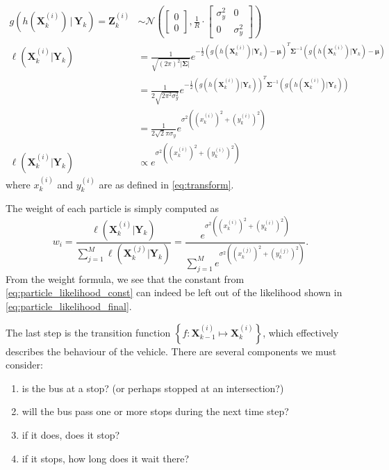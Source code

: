 \documentclass[14paper,twoside]{article}
\newcommand{\bX}{\mathbf{X}}
\newcommand{\bY}{\mathbf{Y}}
\newcommand{\bZ}{\mathbf{Z}}
\newcommand{\g}[1]{g\left(#1\right)}
\newcommand{\lhood}[1]{\ell\left(#1\right)}
\begin{document}
\begin{align}
  \label{eq:particle_likelihood}
  \g{h(\bX_k^{(i)}) \,|\, \bY_k} = \bZ_k^{(i)} 
  &\sim  \mathcal{N}\left(
    \begin{bmatrix}
      0 \\ 0
    \end{bmatrix},
    \frac{1}{R}\cdot\begin{bmatrix}
      \sigma_y^2 & 0 \\ 0 & \sigma_y^2
    \end{bmatrix}
  \right) \\
  \lhood{\bX_k^{(i)}| \bY_k} 
  &= \frac{1}{\sqrt{\left(2\pi\right)^2 \left| \boldsymbol{\Sigma} \right|}}
    e^{-\frac{1}{2}\left(g(h(\bX_k^{(i)})|\bY_k) - \boldsymbol{\mu}\right)^T\boldsymbol\Sigma^{-1}\left(g(h(\bX_k^{(i)})|\bY_k) - 
    \boldsymbol{\mu}\right)} \nonumber \\
  &= \frac{1}{2\sqrt{2\pi^2 \sigma_y^2}} 
    e^{-\frac{1}{2}  \left(g(h(\bX_k^{(i)})|\bY_k)\right)^T \boldsymbol\Sigma^{-1} \left(g(h(\bX_k^{(i)})|\bY_k)\right) } \nonumber \\
  \label{eq:particle_likelihood_const}
  &= \frac{1}{2\sqrt{2}\pi \sigma_y} e^{\sigma^2\left((x_k^{(i)})^2 + (y_k^{(i)})^2\right)} \\
  \label{eq:particle_likelihood_final}
  \lhood{\bX_k^{(i)}| \bY_k} 
  &\propto e^{\sigma^2\left((x_k^{(i)})^2 + (y_k^{(i)})^2\right)}
\end{align}
where $x_k^{(i)}$ and $y_k^{(i)}$ are as defined in \cref{eq:transform}.

The weight of each particle is simply computed as
\begin{equation}
  \label{eq:particle_weights}
  w_i = \frac{\lhood{\bX_k^{(i)} | \bY_k}}{\sum_{j=1}^M \lhood{\bX_k^{(j)} | \bY_k}}
  = \frac{e^{\sigma^2\left((x_k^{(i)})^2 + (y_k^{(i)})^2\right)}}{\sum_{j=1}^M e^{\sigma^2\left((x_k^{(j)})^2 + (y_k^{(j)})^2\right)}}.
\end{equation}
From the weight formula, we see that the constant from \cref{eq:particle_likelihood_const}
can indeed be left out of the likelihood shown in \cref{eq:particle_likelihood_final}.


The last step is the transition function $\left\{ f : \bX_{k-1}^{(i)} \mapsto \bX_k^{(i)} \right \}$,
which effectively describes the behaviour of the vehicle.
There are several components we must consider:
\begin{enumerate}
\item is the bus at a stop? (or perhaps stopped at an intersection?)
\item will the bus pass one or more stops during the next time step?
\item if it does, does it stop?
\item if it stops, how long does it wait there?
\end{enumerate}
\end{document}
